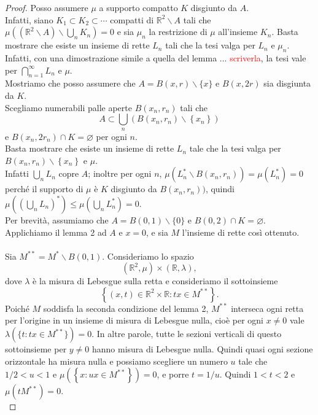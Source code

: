 \documentclass[a4paper, twoside,openright]{article}
\newcommand{\<}{\langle}
\renewcommand{\>}{\rangle}
\begin{document}
\begin{proof}
Posso assumere $\mu$ a supporto compatto $K$ disgiunto da $A$.\\
Infatti, siano $K_{1} \subset K_{2} \subset \cdots$ compatti di $\mathbb{R}^{2} \backslash A$ tali che $\mu\left(\left(\mathbb{R}^{2} \backslash A\right) \backslash \bigcup_{n} K_{n}\right)=0$ e sia $\mu_{n}$ la restrizione di $\mu$ all'insieme $K_{n}$. Basta mostrare che esiste un insieme di rette $L_{n}$ tali che la tesi valga per $L_{n}$ e $\mu_{n}$. Infatti, con una dimostrazione simile a quella del lemma ... \textcolor{red}{scriverla}, la tesi vale per $\bigcap_{n=1}^{\infty} L_{n}$ e $\mu$.\\

Mostriamo che posso assumere che $A=B(x, r) \backslash\{x\}$ e $B(x, 2 r)$ sia disgiunta da $K$.\\
Scegliamo numerabili palle aperte $B\left(x_{n}, r_{n}\right)$ tali che
$$
A \subset \bigcup_{n}\left(B\left(x_{n}, r_{n}\right) \backslash\left\{x_{n}\right\}\right)
$$
e $B\left(x_{n}, 2 r_{n}\right) \cap K=\varnothing$ per ogni $n$.\\
Basta mostrare che esiste un insieme di rette $L_{n}$ tale che la tesi valga per $B\left(x_{n}, r_{n}\right) \backslash\left\{x_{n}\right\}$ e $\mu$.\\
Infatti $\bigcup_n L_n$ copre $A$; inoltre per ogni $n$, $\mu(L_n^* \backslash B(x_n,r_n))=\mu(L_n^*)=0$ perché il supporto di $\mu$ è $K$ disgiunto da $B(x_n,r_n))$, quindi $\mu((\bigcup_nL_n)^*) \leq \mu(\bigcup_n L_n^*)=0$.\\
Per brevità, assumiamo che $A=B(0,1) \backslash\{0\}$ e $B(0,2) \cap K=\varnothing$. Applichiamo il lemma 2 ad $A$ e $x=0$, e sia $M$ l'insieme di rette così ottenuto.\\
\hfill \\
Sia $M^{* *}=M^{*} \backslash B(0,1)$. Consideriamo lo spazio
$$
\left(\mathbb{R}^{2}, \mu\right) \times(\mathbb{R}, \lambda),
$$
dove $\lambda$ è la misura di Lebesgue sulla retta e consideriamo il sottoinsieme
$$
\left\{(x, t) \in \mathbb{R}^{2} \times \mathbb{R}: t x \in M^{* *}\right\} .
$$
Poiché $M$ soddisfa la seconda condizione del lemma 2, $M^{**}$ interseca ogni retta per l'origine in un insieme di misura di Lebesgue nulla, cioè per ogni $x \neq 0$ vale $\lambda(\{t: tx \in M^{**}\})=0$. In altre parole, tutte le sezioni verticali di questo sottoinsieme per $y\neq 0$  hanno misura di Lebesgue nulla. Quindi quasi ogni sezione orizzontale ha misura nulla e possiamo scegliere un numero $u$ tale che $1 / 2<u<1$ e $\mu\left(\left\{x: u x \in M^{* *}\right\}\right)=0$, e porre $t=1 / u$. Quindi $1<t<2$ e $\mu\left(t M^{* *}\right)=0$.\\

\end{proof}
\end{document}
